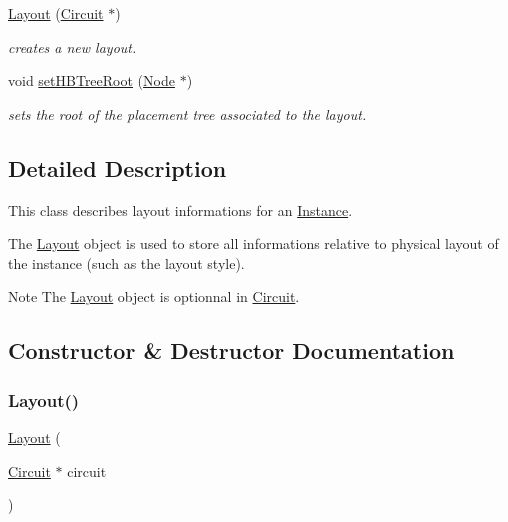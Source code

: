 \begin{DoxyCompactItemize}
\mbox{\hyperlink{class_open_chams_1_1_layout_a789d82a4c563002befc83d538431d474}{Layout}} (\mbox{\hyperlink{class_open_chams_1_1_circuit}{Circuit}} $\ast$)
\begin{DoxyCompactList}\small\item\em creates a new layout. \end{DoxyCompactList}\item 
void \mbox{\hyperlink{class_open_chams_1_1_layout_a6d828958e0faf1346b27276eab101858}{set\+H\+B\+Tree\+Root}} (\mbox{\hyperlink{class_open_chams_1_1_node}{Node}} $\ast$)
\begin{DoxyCompactList}\small\item\em sets the root of the placement tree associated to the layout. \end{DoxyCompactList}\end{DoxyCompactItemize}


\subsection{Detailed Description}
This class describes layout informations for an \mbox{\hyperlink{class_open_chams_1_1_instance}{Instance}}.

The \mbox{\hyperlink{class_open_chams_1_1_layout}{Layout}} object is used to store all informations relative to physical layout of the instance (such as the layout style).

\begin{DoxyNote}{Note}
The \mbox{\hyperlink{class_open_chams_1_1_layout}{Layout}} object is optionnal in \mbox{\hyperlink{class_open_chams_1_1_circuit}{Circuit}}. 
\end{DoxyNote}


\subsection{Constructor \& Destructor Documentation}
\mbox{\label{class_open_chams_1_1_layout_a789d82a4c563002befc83d538431d474}} 
\subsubsection{\texorpdfstring{Layout()}{Layout()}}
{\footnotesize\ttfamily \mbox{\hyperlink{class_open_chams_1_1_layout}{Layout}} (\begin{DoxyParamCaption}\item[{\mbox{\hyperlink{class_open_chams_1_1_circuit}{Circuit}} $\ast$}]{circuit }\end{DoxyParamCaption})}



